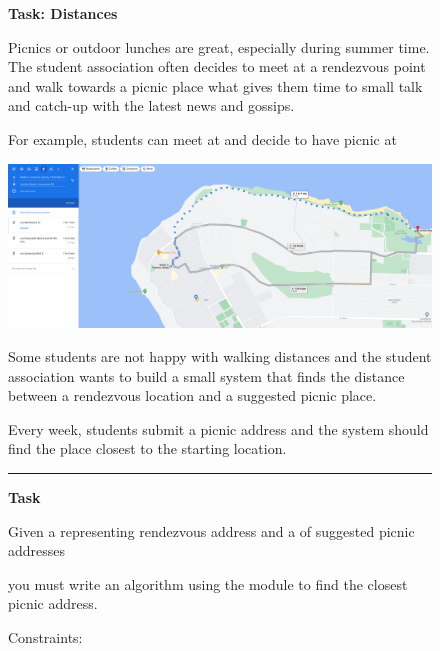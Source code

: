 \begin{figure}
\begin{mdframed}[backgroundcolor=gray!04] 
\begin{scriptsize}

{\large \textbf{Task: Distances}} \bigskip


Picnics or outdoor lunches are great, especially during summer time. The student association often decides to meet at a rendezvous point and walk towards a picnic place what gives them time to small talk and catch-up with the latest news and gossips. \medskip

For example, students can meet at 
and decide to have picnic at 
  \medskip

\medskip

\includegraphics[width=\textwidth]{appendix/cp6/jericho.png}

\medskip


Some students are not happy with walking distances and the student association wants to build a small system that finds the distance between a rendezvous location and a suggested picnic place.  \medskip

Every week, students submit a picnic address and the system should find the place closest to the starting location. \medskip


\begin{center}
\rule{10cm}{0.4pt}
\end{center}

\textbf{Task} \medskip



Given a 
representing rendezvous address and a 
of suggested picnic addresses

you must write an algorithm using the 
module to find the closest picnic address. \medskip


Constraints:


\end{scriptsize}
\end{mdframed}
\end{figure}
